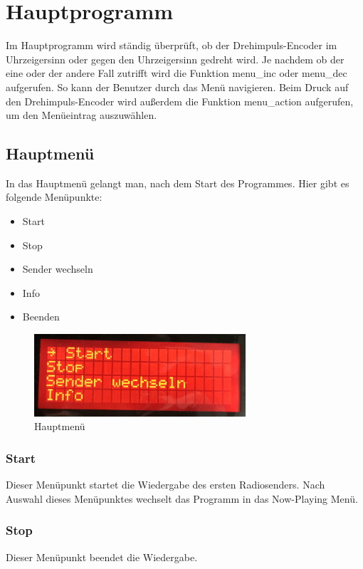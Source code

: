 \section{Hauptprogramm}
Im Hauptprogramm wird ständig überprüft, ob der Drehimpuls-Encoder im Uhrzeigersinn oder gegen den Uhrzeigersinn gedreht wird. Je nachdem ob der eine oder der andere Fall zutrifft wird die Funktion menu\_inc oder menu\_dec aufgerufen. So kann der Benutzer durch das Menü navigieren. Beim Druck auf den Drehimpuls-Encoder wird außerdem die Funktion menu\_action aufgerufen, um den Menüeintrag auszuwählen.

\subsection{Hauptmenü}
In das Hauptmenü gelangt man, nach dem Start des Programmes. Hier gibt es folgende Menüpunkte:
\begin{itemize}
	\item Start
	\item Stop
	\item Sender wechseln
	\item Info
	\item Beenden
\end{itemize}

\begin{figure}[H] 
  \centering
     \includegraphics[width=0.7\textwidth]{Bilder/mainmenu.png}
  \caption{Hauptmenü}
  \label{fig:mainmenu}
\end{figure}

\subsubsection{Start}
Dieser Menüpunkt startet die Wiedergabe des ersten Radiosenders. Nach Auswahl dieses Menüpunktes wechselt das Programm in das Now-Playing Menü.

\subsubsection{Stop}
Dieser Menüpunkt beendet die Wiedergabe.

